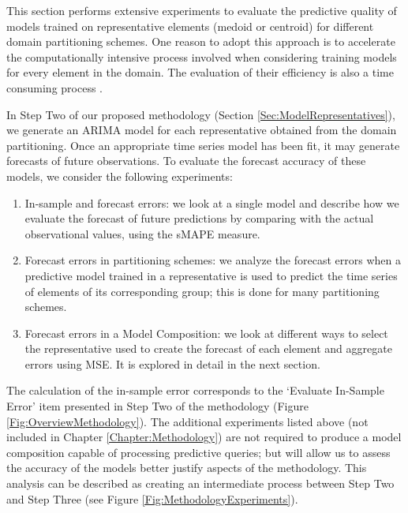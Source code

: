 This section performs extensive experiments to evaluate the predictive quality of models trained on representative elements (medoid or centroid) for different domain partitioning schemes. One reason to adopt this approach is to accelerate the computationally intensive process involved when considering training models for every element in the domain. The evaluation of their efficiency is also a time consuming process \cite{Hyndman2018}.

In Step Two of our proposed methodology (Section \ref{Sec:ModelRepresentatives}), we generate an ARIMA model for each representative obtained from the domain partitioning. Once an appropriate time series model has been fit, it may generate forecasts of future observations. To evaluate the forecast accuracy of these models, we consider the following experiments:

\begin{enumerate}
    \item In-sample and forecast errors: we look at a single model and describe how we evaluate the forecast of future predictions by comparing with the actual observational values, using the sMAPE measure.
    \item Forecast errors in partitioning schemes: we analyze the forecast errors when a predictive model trained in a representative is used to predict the time series of elements of its corresponding group; this is done for many partitioning schemes.
    \item Forecast errors in a Model Composition: we look at different ways to select the representative used to create the forecast of each element and aggregate errors using MSE. It is explored in detail in the next section.
\end{enumerate}

The calculation of the in-sample error corresponds to the `Evaluate In-Sample Error' item presented in Step Two of the methodology (Figure \ref{Fig:OverviewMethodology}). The additional experiments listed above (not included in Chapter \ref{Chapter:Methodology}) are not required to produce a model composition capable of processing predictive queries; but will allow us to assess the accuracy of the models better justify aspects of the methodology. This analysis can be described as creating an intermediate process between Step Two and Step Three (see Figure \ref{Fig:MethodologyExperiments}). 

